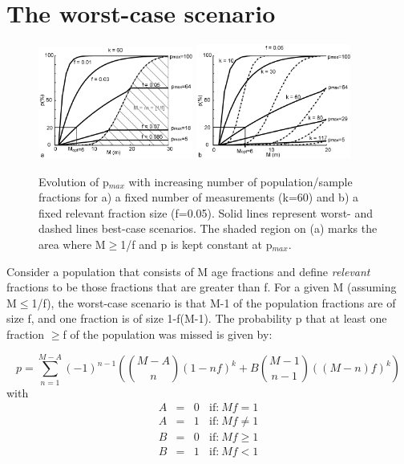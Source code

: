 \documentclass[12]{article}
\begin{document}
\section{The worst-case scenario}\label{sec:worst}

\begin{figure}[here]
  \centering                      
  \includegraphics[width=2in]{fig1a.jpg}
  \includegraphics[width=2in]{fig1b.jpg}
  \caption{Evolution of  p$_{max}$ with increasing number of population/sample 
fractions for a) a fixed number  of measurements (k=60) and b) a fixed
relevant  fraction size  (f=0.05).  Solid  lines represent  worst- and
dashed lines best-case scenarios.  The  shaded region on (a) marks the
area where M$\geq$1/f and p is kept constant at p$_{max}$.}
  \label{fig:1}
\end{figure}

Consider a population that consists of M age fractions and define {\it
relevant} fractions to be those fractions that are greater than f. For
a given M  (assuming M$\leq$1/f), the worst-case scenario  is that M-1
of the population fractions are of size f, and one fraction is of size
1-f(M-1).  The probability p that at least one fraction $\geq$f of the
population was missed is given by:

\begin{equation}
  \label{eq:2}
p  =  \sum_{n=1}^{M-A}(-1)^{n-1} \left(  \binom{M-A}{n}  (1-nf)^k +  B
    \binom{M-1}{n-1} ((M-n)f)^k \right)
\end{equation}
with
\begin{eqnarray*}
A & =    & 0~~~~ \mbox{if:} ~ Mf = 1\\
A & =    & 1~~~~ \mbox{if:} ~ Mf \neq 1\\
B & =    & 0~~~~ \mbox{if:} ~ Mf \geq 1\\
B & =    & 1~~~~ \mbox{if:} ~ Mf < 1
\end{eqnarray*}
\end{document}
